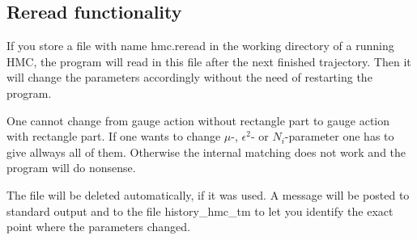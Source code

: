 \subsection{Reread functionality}

If you store a file with name {\ttfamily hmc.reread} in the working
directory of a running HMC, the program will read in this file after
the next finished trajectory. Then it will change the parameters
accordingly without the need of restarting the program. 

One cannot change from gauge action without rectangle part to gauge
action with rectangle part. If one wants to change $\mu$-,
$\epsilon^2$- or $N_i$-parameter one has to give allways all of
them. Otherwise the internal matching does not work and the program
will do nonsense.

The file will be deleted automatically, if it was used. A message will
be posted to standard output and to the file {\ttfamily
  history\_hmc\_tm} to let you identify the exact point where the
parameters changed.

